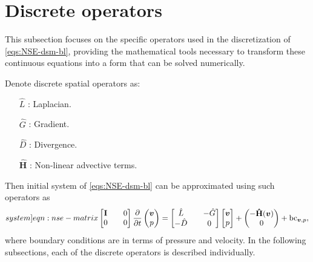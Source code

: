 \documentclass{article}
\numberwithin{equation}{section}
\begin{document}
\pagebreak
\section{Discrete operators}\label{sec:discrete-operators}

This subsection focuses on the specific operators used in the discretization of \cref{eqs:NSE-dsm-bl}, providing the mathematical tools necessary to transform these continuous equations into a form that can be solved numerically.

Denote discrete spatial operators as:
\begin{enumerate}
	\item[$\hat{L}$]:  Laplacian.
	\item[$\hat{G}$]: Gradient.
	\item[$\hat{D}$]: Divergence.
	\item[$\mathbf{\hat{H}}$]: Non-linear advective terms.
\end{enumerate}
Then initial system of \cref{eqs:NSE-dsm-bl} can be approximated using such operators as
\begin{equation}\label[system]{eqn:nse-matrix}
            \begin{bmatrix}
                  \mathbf{I} && 0 \\ 
                  0 && 0
            \end{bmatrix}
            \frac{\partial }{\partial t} 
            \begin{pmatrix}
                  \boldsymbol{v} \\ 
                  p
            \end{pmatrix}
            =
            \begin{bmatrix}
                  \hat{L} && - \hat{G} \\ 
                  -\hat{D} && 0
            \end{bmatrix}
            \begin{bmatrix}
                  \boldsymbol{v} \\
                  p
            \end{bmatrix}
            +
            \begin{pmatrix}
                  -\mathbf{\hat{H}}(\boldsymbol{v})\\
                  0
            \end{pmatrix} + \text{bc}_{\boldsymbol{v},p},
        \end{equation}
where boundary conditions are in terms of pressure and velocity. In the following subsections, each of the discrete operators is described individually. 
\end{document}
